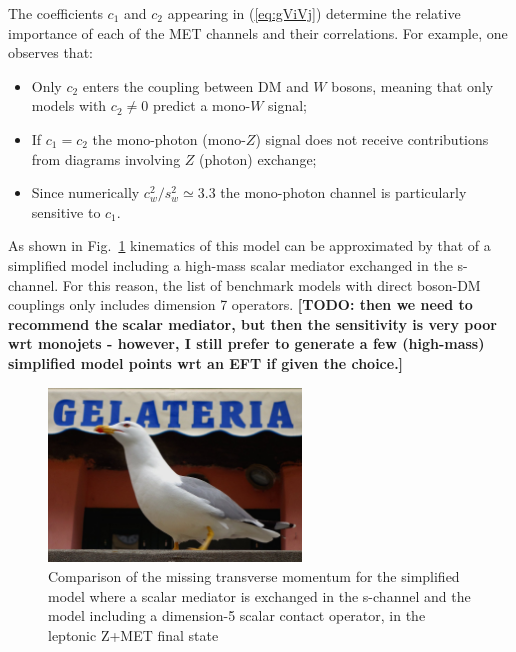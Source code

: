 The coefficients $c_1$ and $c_2$ appearing in (\ref{eq:gViVj}) determine the relative importance of each of the MET channels and their correlations. For example, one observes that:
\begin{itemize}
 \item Only $c_2$ enters the coupling between DM and $W$ bosons, meaning that only models with $c_2 \neq 0$ predict a mono-$W$ signal;
 \item If $c_1 = c_2$ the mono-photon (mono-$Z$) signal does not receive contributions from diagrams involving $Z$ (photon) exchange;
  \item Since numerically $c_w^2/s_w^2 \simeq 3.3$ the mono-photon channel is particularly sensitive to $c_1$.
\end{itemize}





As shown in Fig.~\ref{fig:EW_EFT5_Zlep_MET}
kinematics of this model can be approximated by that of a simplified model including
a high-mass scalar mediator exchanged in the s-channel. For this reason,
the list of benchmark models with direct boson-DM couplings only includes dimension 7 operators.
\textbf{[TODO: then we need to recommend the scalar mediator,
but then the sensitivity is very poor wrt monojets - however, I still prefer
to generate a few (high-mass) simplified model points wrt an EFT if given the choice.]}

\begin{figure}
    \includegraphics[width=0.6\textwidth]{figures/gull}
    \caption{Comparison of the missing transverse momentum for the simplified model
    where a scalar mediator is exchanged in the s-channel and the model including
    a dimension-5 scalar contact operator, in the leptonic Z+MET final state}
    \label{fig:EW_EFT5_Zlep_MET}
\end{figure}

